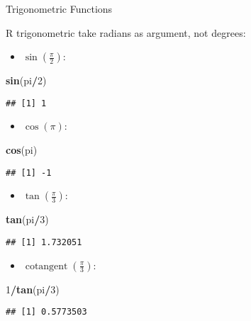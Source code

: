 \documentclass[ignorenonframetext,]{beamer}
\newenvironment{Shaded}{\begin{snugshade}}{\end{snugshade}}
\newcommand{\DecValTok}[1]{\textcolor[rgb]{0.00,0.00,0.81}{#1}}
\newcommand{\KeywordTok}[1]{\textcolor[rgb]{0.13,0.29,0.53}{\textbf{#1}}}
\newcommand{\NormalTok}[1]{#1}
\newcommand{\OperatorTok}[1]{\textcolor[rgb]{0.81,0.36,0.00}{\textbf{#1}}}
\providecommand{\tightlist}{%
  \setlength{\itemsep}{0pt}\setlength{\parskip}{0pt}}
\begin{document}
\begin{frame}[fragile]{Trigonometric Functions}
\protect\hypertarget{trigonometric-functions}{}

R trigonometric take radians as argument, not degrees:

\begin{itemize}
\tightlist
\item
  \(\operatorname{sin}(\frac{\pi}{2})\):
\end{itemize}

\begin{Shaded}
\begin{Highlighting}[]
\KeywordTok{sin}\NormalTok{(pi}\OperatorTok{/}\DecValTok{2}\NormalTok{)}
\end{Highlighting}
\end{Shaded}

\begin{verbatim}
## [1] 1
\end{verbatim}

\begin{itemize}
\tightlist
\item
  \(\operatorname{cos}(\pi)\):
\end{itemize}

\begin{Shaded}
\begin{Highlighting}[]
\KeywordTok{cos}\NormalTok{(pi)}
\end{Highlighting}
\end{Shaded}

\begin{verbatim}
## [1] -1
\end{verbatim}

\begin{itemize}
\tightlist
\item
  \(\operatorname{tan}(\frac{\pi}{3})\):
\end{itemize}

\begin{Shaded}
\begin{Highlighting}[]
\KeywordTok{tan}\NormalTok{(pi}\OperatorTok{/}\DecValTok{3}\NormalTok{)}
\end{Highlighting}
\end{Shaded}

\begin{verbatim}
## [1] 1.732051
\end{verbatim}

\begin{itemize}
\tightlist
\item
  \(\operatorname{cotangent}(\frac{\pi}{3})\):
\end{itemize}

\begin{Shaded}
\begin{Highlighting}[]
\DecValTok{1}\OperatorTok{/}\KeywordTok{tan}\NormalTok{(pi}\OperatorTok{/}\DecValTok{3}\NormalTok{)}
\end{Highlighting}
\end{Shaded}

\begin{verbatim}
## [1] 0.5773503
\end{verbatim}

\end{frame}
\end{document}
